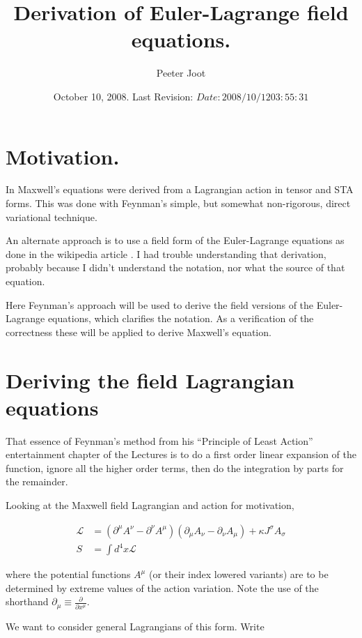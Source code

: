 \documentclass{article}
\title{ Derivation of Euler-Lagrange field equations.}
\author{Peeter Joot}
\date{ October 10, 2008.  Last Revision: $Date: 2008/10/12 03:55:31 $ }
\newcommand{\LL}[0]{\mathcal{L}}
\newcommand{\PD}[2]{\frac{\partial {#2}}{\partial {#1}}}
\begin{document}
\maketitle{}

\tableofcontents

\section{ Motivation. }

In \cite{PJMaxwellLagrangian} Maxwell's equations were derived from
a Lagrangian action in tensor and STA forms.  This was done with 
Feynman's \cite{feynman1963flp} simple, but somewhat non-rigorous, direct variational technique.

An alternate approach is to use a field form of the Euler-Lagrange
equations as done in the wikipedia article \cite{wikiemtensor}.  I had
trouble understanding that derivation, probably because
I didn't understand the notation, nor what the source of that equation.

Here Feynman's approach will be used to derive the field versions of the Euler-Lagrange
equations, which clarifies the notation.  As a verification of the correctness these
will be applied to derive Maxwell's equation.

\section{ Deriving the field Lagrangian equations }

That essence of Feynman's method from his 
``Principle of Least Action'' entertainment chapter of the Lectures is
to do a first order linear expansion of the function, ignore all the higher order terms,
then do the integration by parts for the remainder.

Looking at the Maxwell field Lagrangian and action for motivation,

\begin{align*}
\LL &= (\partial^\mu A^\nu - \partial^\nu A^\mu) (\partial_\mu A_\nu - \partial_\nu A_\mu) + \kappa J^\sigma A_\sigma \\
S &= \int d^4 x \LL
\end{align*}

where the potential functions $A^\mu$ (or their index lowered variants)
are to be determined by extreme values of the action variation.  Note the use of the shorthand
$\partial_\mu \equiv \PD{x^\mu}{}$.

We want to consider general Lagrangians of this form.  Write
\end{document}
